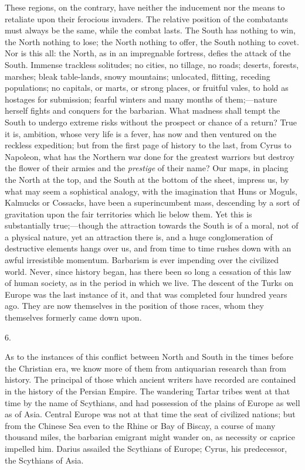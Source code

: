These regions, on the
contrary, have neither the inducement nor the means to retaliate upon
their ferocious invaders. The relative position of the combatants must
always be the same, while the combat lasts. The South has nothing to
win, the North nothing to lose; the North nothing to offer, the South
nothing to covet. Nor is this all: the North, as in an impregnable
fortress, defies the attack of the South. Immense trackless solitudes;
no cities, no tillage, no roads; deserts, forests, marshes; bleak
table-lands, snowy mountains; unlocated, flitting, receding
populations; no capitals, or marts, or strong places, or fruitful
vales, to hold as hostages for submission; fearful winters and many
months of them;—nature herself fights and conquers for the
barbarian. What madness shall tempt the South to undergo extreme risks
without the prospect or chance of a return? True it is, ambition,
whose very life is a fever, has now and then ventured on the reckless
expedition; but from the first page of history to the last, from Cyrus
to Napoleon, what has the Northern war done for the greatest warriors
but destroy the flower of their armies and the \emph{prestige} of
their name? Our maps, in placing the North at the top, and the South
at the bottom of the sheet, impress us, by what may seem a sophistical
analogy, with the imagination that Huns or Moguls, Kalmucks or
Cossacks, have been a superincumbent mass, descending by a sort of
gravitation upon the fair territories which lie below them. Yet this
is substantially true;—though the attraction towards the South is of
a moral, not of a physical nature, yet an attraction there is, and a
huge conglomeration of destructive elements hangs over us, and from
time to time rushes down with an awful irresistible momentum.
Barbarism is ever impending over the civilized world. Never, since
history began, has there been so long a cessation of this law of human
society, as in the period in which we live. The descent of the Turks
on Europe was the last instance of it, and that was completed four
hundred years ago. They are now themselves in the position of those
races, whom they themselves formerly came down upon.

6.

As to the instances of this
conflict between North and South in the times before the Christian
era, we know more of them from antiquarian research than from history.
The principal of those which ancient writers have recorded are
contained in the history of the Persian Empire. The wandering Tartar
tribes went at that time by the name of Scythians, and had possession
of the plains of Europe as well as of Asia. Central Europe was not at
that time the seat of civilized nations; but from the Chinese Sea even
to the Rhine or Bay of Biscay, a course of many thousand miles, the
barbarian emigrant might wander on, as necessity or caprice impelled
him. Darius assailed the Scythians of Europe; Cyrus, his predecessor,
the Scythians of Asia.

